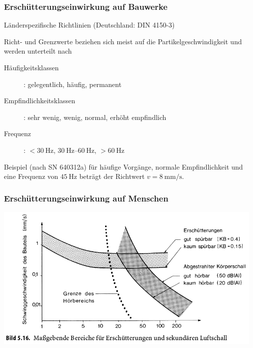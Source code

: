 \begin{frame}
\frametitle{Erschütterungseinwirkung {\normalsize auf Bauwerke}}
Länderspezifische Richtlinien (Deutschland: DIN 4150-3)

Richt- und Grenzwerte beziehen sich meist auf die Partikelgeschwindigkeit und werden unterteilt nach
\begin{description}
 \item[Häufigkeitsklassen]: gelegentlich, häufig, permanent
 \item[Empfindlichkeitsklassen]: sehr wenig, wenig, normal, erhöht empfindlich  
 \item[Frequenz]: $<\SI{30}{\hertz}$, $\SI{30}{\hertz}$--$\SI{60}{\hertz}$, $>\SI{60}{\hertz}$
\end{description}

\bigskip

Beispiel (nach SN 640312a) für häufige Vorgänge, normale Empfindlichkeit und eine Frequenz von $\SI{45}{\hertz}$ beträgt der Richtwert $v=\SI{8}{\milli\metre\per\second}$.
\end{frame}


\begin{frame}
\frametitle{Erschütterungseinwirkung {\normalsize auf Menschen}}
\includegraphics[width=0.99\textwidth]{fig_img/grenzwerte_schall} 
\end{frame}




